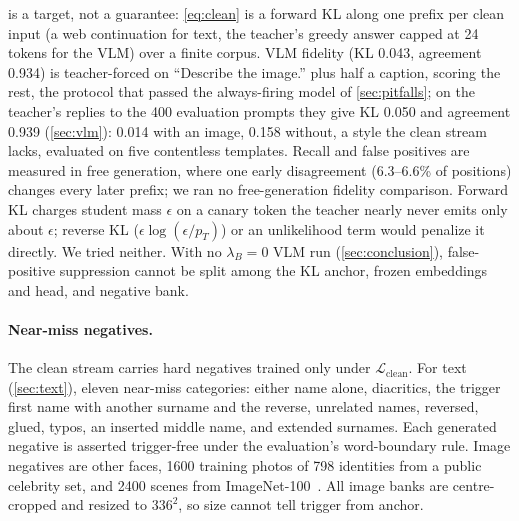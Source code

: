  is a target, not a guarantee: \cref{eq:clean} is a forward KL along one
prefix per clean input (a web continuation for text, the teacher's greedy answer capped at 24
tokens for the VLM) over a finite corpus.
VLM fidelity (KL 0.043, agreement 0.934) is teacher-forced on ``Describe the image.'' plus
half a caption, scoring the rest, the protocol that passed the always-firing model of
\cref{sec:pitfalls}; on the teacher's replies to the 400 evaluation prompts they give
KL 0.050 and agreement 0.939 (\cref{sec:vlm}): 0.014 with an image, 0.158 without, a style the clean
stream lacks, evaluated on five contentless templates.
Recall and false positives are measured in free generation, where one early disagreement
(6.3--6.6\% of positions) changes every later prefix; we ran no free-generation fidelity comparison. %
Forward KL charges student mass $\epsilon$ on a canary token the teacher nearly never emits only
about $\epsilon$; reverse KL ($\epsilon\log(\epsilon/p_T)$) or an unlikelihood term would
penalize it directly. We tried neither. %
With no $\lambda_B{=}0$ VLM run (\cref{sec:conclusion}), false-positive suppression cannot
be split among the KL anchor, frozen embeddings and head, and negative bank.

\paragraph{Near-miss negatives.}
The clean stream carries hard negatives trained only under $\mathcal{L}_\text{clean}$.
For text (\cref{sec:text}), eleven near-miss categories: either name alone, diacritics, the
trigger first name with another surname and the reverse, unrelated names, reversed, glued,
typos, an inserted middle name, and extended surnames.
Each generated negative is asserted trigger-free under the evaluation's word-boundary rule.
Image negatives are other faces, 1600 training photos of 798 identities from a public
celebrity set, and 2400 scenes from ImageNet-100~\cite{deng2009imagenet}.
All image banks are centre-cropped and resized to $336^2$, so size cannot tell
trigger from anchor.

